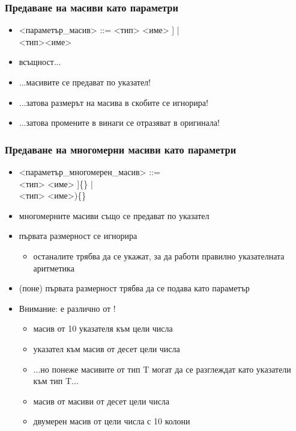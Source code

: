 \documentclass[alsotrans]{beamerswitch}
\begin{document}
\begin{frame}
  \frametitle{Предаване на масиви като параметри}

  \small
  \begin{itemize}[<+->]
  \item{} <параметър\_масив> ::= <тип> <име> \tta[[<константен\_израз>]\tta] |\\
    \hspace{13em}<тип>\tta* <име>
  \item всъщност...
  \item ...масивите се предават \alert{по указател}!
  \item ...затова размерът на масива в скобите се игнорира!
  \item ...затова промените в винаги се отразяват в оригинала!
  \end{itemize}
\end{frame}

\begin{frame}
  \frametitle{Предаване на многомерни масиви като параметри}

  \small
  \begin{itemize}[<+->]
  \item{} <параметър\_многомерен\_масив> ::= \\
    \hspace{5em}<тип> <име> \tta[[<константа>]\tta]\{\} |\\
    \hspace{5em}<тип> \tta{(*}<име>\tta)\{\}
    \item многомерните масиви също се предават по указател
    \item първата размерност се игнорира
      \begin{itemize}
      \item останалите трябва да се укажат, за да работи правилно указателната аритметика
      \end{itemize}
    \item (поне) първата размерност трябва да се подава като параметър
    \item \alert{Внимание:}  \alert{е различно от}
      !
      \begin{itemize}
      \item {} \eqv масив от 10 указателя към цели числа
      \item {} \eqv указател към масив от десет цели
        числа
      \item ...но понеже масивите от тип T могат да се разглеждат като
        указатели към тип T...
      \item {} \eqv масив от масиви от десет цели числа
      \item {} \eqv двумерен масив от цели числа с 10 колони
      \end{itemize}
  \end{itemize}
\end{frame}
\end{document}
